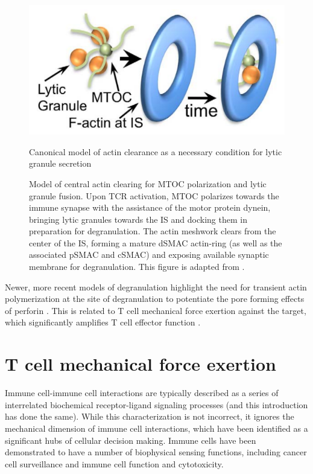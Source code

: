 \begin{figure}[htbp]
	\centering
	\includegraphics[width=\textwidth]{../figures/chapter1/actinclearance.png}
	\caption{Canonical model of actin clearance as a necessary condition for lytic granule secretion}
	\caption*{Model of central actin clearing for MTOC polarization and lytic granule fusion. Upon TCR activation, MTOC polarizes towards the immune synapse with the assistance of the motor protein dynein, bringing lytic granules towards the IS and docking them in preparation for degranulation. The actin meshwork clears from the center of the IS, forming a mature dSMAC actin-ring (as well as the associated pSMAC and cSMAC) and exposing available synaptic membrane for degranulation. This figure is adapted from \cite{Rak2011}.}
	\label{fig:actinclearance}
\end{figure}

Newer, more recent models of degranulation highlight the need for transient actin polymerization at the site of degranulation to potentiate the pore forming effects of perforin \cite{Tamzalit2018}. This is related to T cell mechanical force exertion against the target, which significantly amplifies T cell effector function \cite{Tamzalit2018}.

\section{T cell mechanical force exertion}
Immune cell-immune cell interactions are typically described as a series of interrelated biochemical receptor-ligand signaling processes (and this introduction has done the same). While this characterization is not incorrect, it ignores the mechanical dimension of immune cell interactions, which have been identified as a significant hubs of cellular decision making. Immune cells have been demonstrated to have a number of biophysical sensing functions, including cancer cell surveillance and immune cell function and cytotoxicity.

